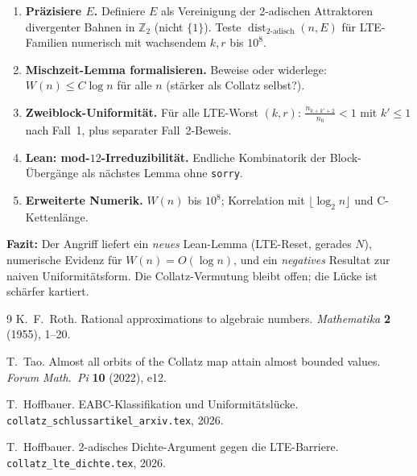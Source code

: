 \documentclass[12pt,a4paper]{article}
\newcommand{\Ztwo}{\mathbb{Z}_2}
\newcommand{\disttwo}{\operatorname{dist}_{2\text{-adisch}}}
\begin{document}
\begin{enumerate}[label=\textbf{\arabic*.}]
  \item \textbf{Präzisiere $E$.} Definiere $E$ als Vereinigung der
    2-adischen Attraktoren divergenter Bahnen in $\Ztwo$ (nicht $\{1\}$).
    Teste $\disttwo(n,E)$ für LTE-Familien numerisch mit wachsendem
  $k,r$ bis $10^8$.
  \item \textbf{Mischzeit-Lemma formalisieren.} Beweise oder widerlege:
    $W(n)\leq C\log n$ für alle $n$ (stärker als Collatz selbst?).
  \item \textbf{Zweiblock-Uniformität.} Für alle LTE-Worst $(k,r)$:
    $\frac{n_{k+k'+2}}{n_0}<1$ mit $k'\leq 1$ nach Fall~1, plus
    separater Fall~2-Beweis.
  \item \textbf{Lean: mod-$12$-Irreduzibilität.} Endliche Kombinatorik
    der Block-Übergänge als nächstes Lemma ohne \texttt{sorry}.
  \item \textbf{Erweiterte Numerik.} $W(n)$ bis $10^8$; Korrelation mit
    $\lfloor\log_2 n\rfloor$ und C-Kettenlänge.
\end{enumerate}

\begin{tcolorbox}[kern]
\textbf{Fazit:} Der Angriff liefert ein \emph{neues} Lean-Lemma
(LTE-Reset, gerades $N$), numerische Evidenz für $W(n)=O(\log n)$,
und ein \emph{negatives} Resultat zur naiven Uniformitätsform.
Die Collatz-Vermutung bleibt offen; die Lücke ist schärfer kartiert.
\end{tcolorbox}

\begin{thebibliography}{9}
K.~F.~Roth.
Rational approximations to algebraic numbers.
\textit{Mathematika} \textbf{2} (1955), 1--20.

T.~Tao.
Almost all orbits of the Collatz map attain almost bounded values.
\textit{Forum Math.\ Pi} \textbf{10} (2022), e12.

T.~Hoffbauer.
EABC-Klassifikation und Uniformitätslücke.
\texttt{collatz\_schlussartikel\_arxiv.tex}, 2026.

T.~Hoffbauer.
2-adisches Dichte-Argument gegen die LTE-Barriere.
\texttt{collatz\_lte\_dichte.tex}, 2026.
\end{thebibliography}
\end{document}
